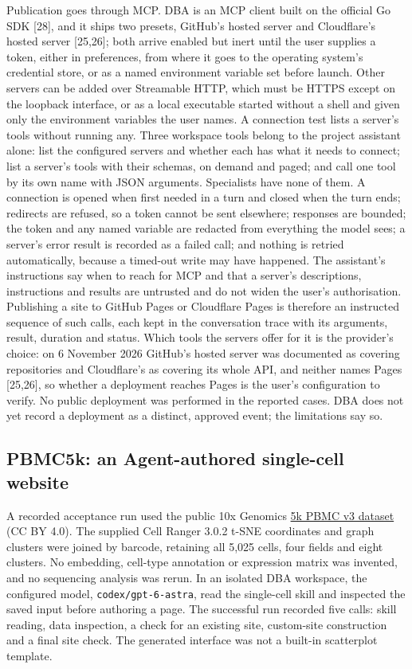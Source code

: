 \documentclass[11pt,a4paper]{article}
\begin{document}
Publication goes through MCP. DBA is an MCP client built on the official
Go SDK {[}28{]}, and it ships two presets, GitHub's hosted server and
Cloudflare's hosted server {[}25,26{]}; both arrive enabled but inert
until the user supplies a token, either in preferences, from where it
goes to the operating system's credential store, or as a named
environment variable set before launch. Other servers can be added over
Streamable HTTP, which must be HTTPS except on the loopback interface,
or as a local executable started without a shell and given only the
environment variables the user names. A connection test lists a
server's tools without running any. Three workspace tools belong to the
project assistant alone: list the configured servers and whether each
has what it needs to connect; list a server's tools with their schemas,
on demand and paged; and call one tool by its own name with JSON
arguments. Specialists have none of them. A connection is opened when
first needed in a turn and closed when the turn ends; redirects are
refused, so a token cannot be sent elsewhere; responses are bounded; the
token and any named variable are redacted from everything the model
sees; a server's error result is recorded as a failed call; and nothing
is retried automatically, because a timed-out write may have happened.
The assistant's instructions say when to reach for MCP and that a
server's descriptions, instructions and results are untrusted and do
not widen the user's authorisation. Publishing a site to GitHub Pages or
Cloudflare Pages is therefore an instructed sequence of such calls, each
kept in the conversation trace with its arguments, result, duration and
status. Which tools the servers offer for it is the provider's choice:
on 6 November 2026 GitHub's hosted server was documented as covering
repositories and Cloudflare's as covering its whole API, and neither
names Pages {[}25,26{]}, so whether a deployment reaches Pages is the
user's configuration to verify. No public deployment was performed in
the reported cases. DBA does not yet record a deployment as a
distinct, approved event; the limitations say so.

\subsection{PBMC5k: an Agent-authored single-cell website}\label{pbmc5k-case}

A recorded acceptance run used the public 10x Genomics
\href{https://www.10xgenomics.com/datasets/5-k-peripheral-blood-mononuclear-cells-pbm-cs-from-a-healthy-donor-v-3-chemistry-3-1-standard-3-0-2}{5k PBMC v3 dataset}
(CC BY 4.0). The supplied Cell Ranger 3.0.2 t-SNE coordinates and graph
clusters were joined by barcode, retaining all 5,025 cells, four fields
and eight clusters. No embedding, cell-type annotation or expression
matrix was invented, and no sequencing analysis was rerun. In an isolated
DBA workspace, the configured model, \texttt{codex/gpt-6-astra}, read the
single-cell skill and inspected the saved input before authoring a page.
The successful run recorded five calls: skill reading, data inspection,
a check for an existing site, custom-site construction and a final site
check. The generated interface was not a built-in scatterplot template.
\end{document}
